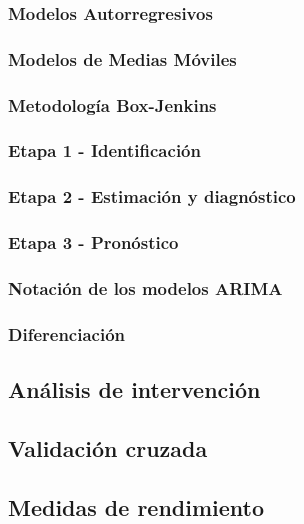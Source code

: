 \documentclass[
]{article}
\begin{document}
\subsubsection{Modelos Autorregresivos}

\subsubsection{Modelos de Medias Móviles}

\subsubsection{Metodología Box-Jenkins}

\subsubsection{Etapa 1 - Identificación}

\subsubsection{Etapa 2 - Estimación y diagnóstico}

\subsubsection{Etapa 3 - Pronóstico}

\subsubsection{Notación de los modelos ARIMA}

\subsubsection{Diferenciación}

\subsection{Análisis de intervención}

\subsection{Validación cruzada}

\subsection{Medidas de rendimiento}
\end{document}

